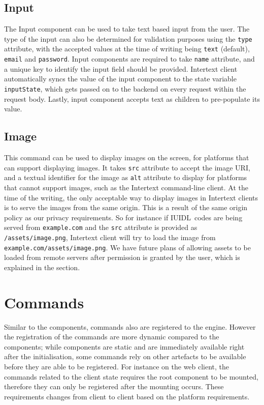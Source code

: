 \subsection{Input}

The Input component can be used to take text based input from the user. The type of the input can also be determined for validation purposes using the \texttt{type} attribute, with the accepted values at the time of writing being \texttt{text} (default), \texttt{email} and \texttt{password}. Input components are required to take \texttt{name} attribute, and a unique key to identify the input field should be provided. Intertext client automatically syncs the value of the input component to the state variable \texttt{inputState}, which gets passed on to the backend on every request within the request body. Lastly, input component accepts text as children to pre-populate its value.

\subsection{Image}

This command can be used to display images on the screen, for platforms that can support displaying images. It takes \texttt{src} attribute to accept the image URI, and a textual identifier for the image as \texttt{alt} attribute to display for platforms that cannot support images, such as the Intertext command-line client. At the time of the writing, the only acceptable way to display images in Intertext clients is to serve the images from the same origin. This is a result of the same origin policy as our privacy requirements. So for instance if IUIDL~codes are being served from \texttt{example.com} and the \texttt{src} attribute is provided as \texttt{/assets/image.png}, Intertext client will try to load the image from \texttt{example.com/assets/image.png}. We have future plans of allowing assets to be loaded from remote servers after permission is granted by the user, which is explained in the  section.

\section{Commands}

Similar to the components, commands also are registered to the engine. However the registration of the commands are more dynamic compared to the components; while components are static and are immediately available right after the initialisation, some commands rely on other artefacts to be available before they are able to be registered. For instance on the web client, the commands related to the client state requires the root component to be mounted, therefore they can only be registered after the mounting occurs. These requirements changes from client to client based on the platform requirements.

